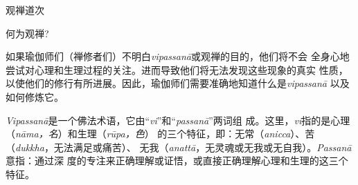 


\beginchapter 观禅道次


\subsectnon \1何为观禅?

如果瑜伽师们（禅修者们）不明白{\it vipassan\=a\/}或观禅的目的，他们将不会
全身心地尝试对心理和生理过程的关注。进而导致他们将无法发现这些现象的真实
性质，以使他们的修行有所进展。因此，瑜伽师们需要准确地知道什么是{\it vipassan\=a}
以及如何修炼它。

{\it Vipassan\=a}是一个佛法术语，它由“{\it vi}”和“{\it passan\=a}”两词组
成。这里，{\it vi}指的是心理（{\it n\=ama，名}）和生理（{\it r\=upa，色}）
的三个特征，即：无常（{\it anicca}）、苦（{\it dukkha}，无法满足或痛苦）、
无我（{\it anatt\=a}，无灵魂或无我或无自我）。{\it Passan\=a}意指：通过深
度的专注来正确理解或证悟，或直接正确理解心理和生理的这三个特征。

\endchapter

\byebye
